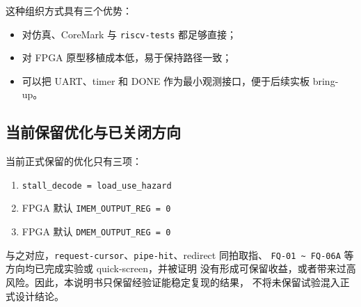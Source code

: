 这种组织方式具有三个优势：

\begin{itemize}
    \item 对仿真、CoreMark 与 \texttt{riscv-tests} 都足够直接；
    \item 对 FPGA 原型移植成本低，易于保持路径一致；
    \item 可以把 UART、timer 和 DONE 作为最小观测接口，便于后续实板 bring-up。
\end{itemize}

\subsection{当前保留优化与已关闭方向}

当前正式保留的优化只有三项：

\begin{enumerate}
    \item \texttt{stall\_decode = load\_use\_hazard}
    \item FPGA 默认 \texttt{IMEM\_OUTPUT\_REG = 0}
    \item FPGA 默认 \texttt{DMEM\_OUTPUT\_REG = 0}
\end{enumerate}

与之对应，\texttt{request-cursor}、\texttt{pipe-hit}、redirect 同拍取指、
\texttt{FQ-01 \textasciitilde{} FQ-06A} 等方向均已完成实验或 quick-screen，并被证明
没有形成可保留收益，或者带来过高风险。因此，本说明书只保留经验证能稳定复现的结果，
不将未保留试验混入正式设计结论。

\clearpage
